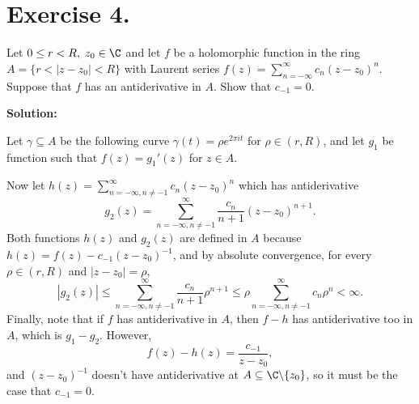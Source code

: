\section*{Exercise 4.}

Let $0 \leq r < R,\; z_0 \in \C$ and let $f$ be a holomorphic function in the ring $A = \{r < | z-z_0 | < R\}$ with Laurent series $f(z) = \sum_{n = -\infty}^{\infty} c_n (z-z_0)^n$. Suppose that $f$ has an antiderivative in $A$. Show that $c_{-1} = 0$.

\textbf{Solution:}

Let $\gamma \subseteq A$ be the following curve $\gamma(t) = \rho e^{2\pi i t}$ for $\rho \in (r, R)$, and let $g_1$ be function such that $f(z) = g_1'(z)$ for $z \in A$. 

Now let $h(z) = \sum_{n = -\infty, n \neq -1}^{\infty} c_n (z-z_0)^n$ which has antiderivative
\[ g_2 (z) = \sum_{n = -\infty, n \neq -1}^{\infty} \frac{c_n}{n+1} (z-z_0)^{n+1}. \]
Both functions $h(z)$ and $g_2(z)$ are defined in $A$ because $h(z) = f(z) - c_{-1}(z-z_0)^{-1}$, and by absolute convergence, for every $\rho \in (r, R)$ and $|z-z_0| = \rho$,
\[ |g_2(z)| \leq  \sum_{n = -\infty, n \neq -1}^{\infty} \frac{c_n}{n+1} \rho^{n+1} \leq \rho \sum_{n = -\infty, n \neq -1}^{\infty} c_n \rho^{n} < \infty. \]
Finally, note that if $f$ has antiderivative in $A$, then $f-h$ has antiderivative too in $A$, which is $g_1 - g_2$. However,
\[ f(z)-h(z) = \frac{c_{-1}}{z-z_0}, \]
and $(z-z_0)^{-1}$ doesn't have antiderivative at $A \subseteq \C \backslash \{z_0\}$, so it must be the case that $c_{-1} = 0$.